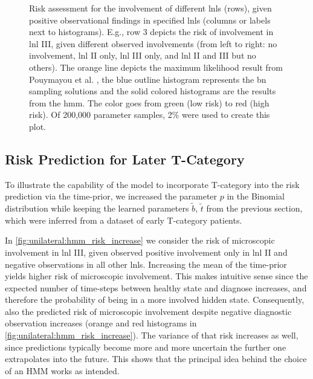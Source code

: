 \documentclass[\relativeRoot/main.tex]{subfiles}
\begin{document}
\begin{figure}
    \centering
    \def\svgwidth{1.0\textwidth}
    
    \caption[
        Comparison of risks predicted by the BN and the HMM
    ]{
        Risk assessment for the involvement of different \glspl{lnl} (rows), given positive observational findings in specified \glspl{lnl} (columns or labels next to histograms). E.g., row 3 depicts the risk of involvement in \gls{lnl} III, given different observed involvements (from left to right: no involvement, \gls{lnl} II only, \gls{lnl} III only, and \gls{lnl} II and III but no others). The orange line depicts the maximum likelihood result from Pouymayou et al. \cite{pouymayou_bayesian_2019}, the blue outline histogram represents the \gls{bn} sampling solutions and the solid colored histograms are the results from the \gls{hmm}. The color goes from green (low risk) to red (high risk). Of 200,000 parameter samples, 2\% were used to create this plot.
    }
    \label{fig:unilateral:hmm_bn_comp}
\end{figure}

\subsection{Risk Prediction for Later T-Category}
\label{subsec:unilateral:application:late_risk}

To illustrate the capability of the model to incorporate T-category into the risk prediction via the time-prior, we increased the parameter $p$ in the Binomial distribution while keeping the learned parameters $\tilde{b}$, $\tilde{t}$ from the previous section, which were inferred from a dataset of early T-category patients.

In \cref{fig:unilateral:hmm_risk_increase} we consider the risk of microscopic involvement in \gls{lnl} III, given observed positive involvement only in \gls{lnl} II and negative observations in all other \glspl{lnl}. Increasing the mean of the time-prior yields higher risk of microscopic involvement. This makes intuitive sense since the expected number of time-steps between healthy state and diagnose increases, and therefore the probability of being in a more involved hidden state. Consequently, also the predicted risk of microscopic involvement despite negative diagnostic observation increases (orange and red histograms in \cref{fig:unilateral:hmm_risk_increase}). The variance of that risk increases as well, since predictions typically become more and more uncertain the further one extrapolates into the future. This shows that the principal idea behind the choice of an HMM works as intended.
\end{document}
